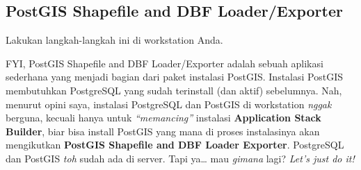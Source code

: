 \documentclass[]{book}
\begin{document}
\hypertarget{postgis-shapefile-and-dbf-loaderexporter}{%
\subsection{PostGIS Shapefile and DBF Loader/Exporter}\label{postgis-shapefile-and-dbf-loaderexporter}}

Lakukan langkah-langkah ini di workstation Anda.

FYI, PostGIS Shapefile and DBF Loader/Exporter adalah sebuah aplikasi sederhana yang menjadi bagian dari paket instalasi PostGIS. Instalasi PostGIS membutuhkan PostgreSQL yang sudah terinstall (dan aktif) sebelumnya. Nah, menurut opini saya, instalasi PostgreSQL dan PostGIS di workstation \emph{nggak} berguna, kecuali hanya untuk \emph{``memancing''} instalasi \textbf{Application Stack Builder}, biar bisa install PostGIS yang mana di proses instalasinya akan mengikutkan \textbf{PostGIS Shapefile and DBF Loader Exporter}. PostgreSQL dan PostGIS \emph{toh} sudah ada di server. Tapi ya\ldots{} mau \emph{gimana} lagi? \emph{Let's just do it!}
\end{document}
